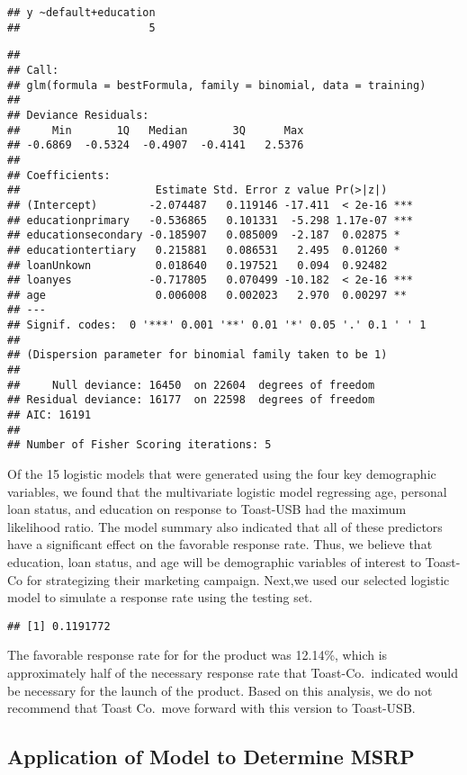 \documentclass[]{article}
\begin{document}
\begin{verbatim}
## y ~default+education 
##                    5
\end{verbatim}

\begin{verbatim}
## 
## Call:
## glm(formula = bestFormula, family = binomial, data = training)
## 
## Deviance Residuals: 
##     Min       1Q   Median       3Q      Max  
## -0.6869  -0.5324  -0.4907  -0.4141   2.5376  
## 
## Coefficients:
##                     Estimate Std. Error z value Pr(>|z|)    
## (Intercept)        -2.074487   0.119146 -17.411  < 2e-16 ***
## educationprimary   -0.536865   0.101331  -5.298 1.17e-07 ***
## educationsecondary -0.185907   0.085009  -2.187  0.02875 *  
## educationtertiary   0.215881   0.086531   2.495  0.01260 *  
## loanUnkown          0.018640   0.197521   0.094  0.92482    
## loanyes            -0.717805   0.070499 -10.182  < 2e-16 ***
## age                 0.006008   0.002023   2.970  0.00297 ** 
## ---
## Signif. codes:  0 '***' 0.001 '**' 0.01 '*' 0.05 '.' 0.1 ' ' 1
## 
## (Dispersion parameter for binomial family taken to be 1)
## 
##     Null deviance: 16450  on 22604  degrees of freedom
## Residual deviance: 16177  on 22598  degrees of freedom
## AIC: 16191
## 
## Number of Fisher Scoring iterations: 5
\end{verbatim}

Of the 15 logistic models that were generated using the four key
demographic variables, we found that the multivariate logistic model
regressing age, personal loan status, and education on response to
Toast-USB had the maximum likelihood ratio. The model summary also
indicated that all of these predictors have a significant effect on the
favorable response rate. Thus, we believe that education, loan status,
and age will be demographic variables of interest to Toast-Co for
strategizing their marketing campaign. Next,we used our selected
logistic model to simulate a response rate using the testing set.

\begin{verbatim}
## [1] 0.1191772
\end{verbatim}

The favorable response rate for for the product was 12.14\%, which is
approximately half of the necessary response rate that
Toast-Co.~indicated would be necessary for the launch of the product.
Based on this analysis, we do not recommend that Toast Co.~move forward
with this version to Toast-USB.

\hypertarget{application-of-model-to-determine-msrp}{%
\subsection{Application of Model to Determine
MSRP}\label{application-of-model-to-determine-msrp}}
\end{document}
